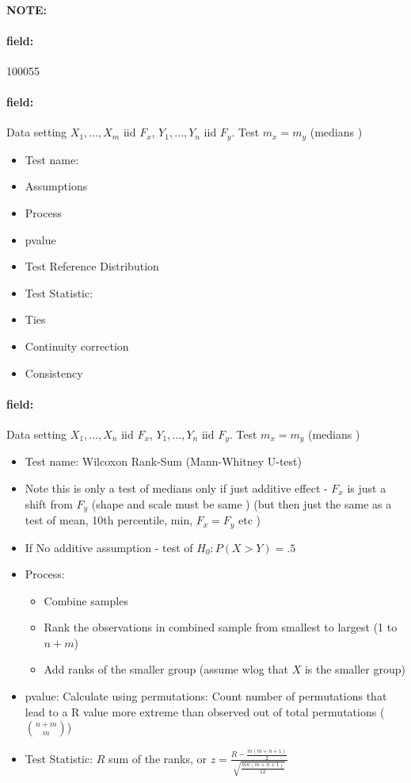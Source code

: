 \documentclass[12pt]{article}
\newenvironment{note}{\paragraph{NOTE:}}{}
\newenvironment{field}{\paragraph{field:}}{}
\begin{document}
\begin{note} \begin{field} \tiny 100055 \end{field}
 \begin{field}
  Data setting $X_1, \ldots , X_m$ iid $F_x$, $Y_1, \ldots, Y_n$ iid $F_y$. Test $m_x = m_y$ (medians )
  \begin{itemize}
   \item Test name:
   \item Assumptions
   \item Process
   \item pvalue
   \item Test Reference Distribution
   \item Test Statistic:
   \item Ties
   \item Continuity correction
   \item Consistency
  \end{itemize}
 \end{field}
 \begin{field}
  Data setting $X_1, \ldots , X_n$ iid $F_x$, $Y_1, \ldots, Y_n$ iid $F_y$. Test $m_x = m_y$ (medians )
  \begin{itemize}
   \item Test name: Wilcoxon Rank-Sum (Mann-Whitney U-test)
   \item Note this is only a test of medians only if just additive effect - $F_x$ is just a shift from $F_y$ (shape and scale must be same ) (but then just the same as a test of mean, 10th percentile, min, $F_x = F_y$ etc )
   \item If No additive assumption - test of $H_0: P(X > Y) = .5$
   \item Process:
         \begin{itemize}
          \item Combine samples
          \item Rank the observations in combined sample from smallest to largest (1 to $n + m$)
          \item Add ranks of the smaller group (assume wlog that $X$ is the smaller group)
         \end{itemize}
   \item pvalue: Calculate using permutations: Count number of permutations that lead to a R value more extreme than observed out of total permutations ($\binom{n+m}{m}$)
   \item Test Statistic: $R$ sum of the ranks, or $z = \frac{R - \frac{m(m+n+1)}{2}}{\sqrt{\frac{mn(m+n+1)}{12}}}$

\end{itemize}
\end{field}
\end{note}
\end{document}
